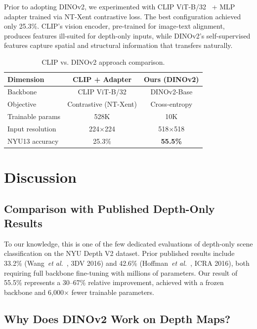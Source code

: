 \documentclass[conference, a4paper]{IEEEtran}
\begin{document}
Prior to adopting DINOv2, we experimented with CLIP ViT-B/32~\cite{clip} + MLP adapter
trained via NT-Xent contrastive loss. The best configuration achieved only 25.3\%.
CLIP's vision encoder, pre-trained for image-text alignment, produces features ill-suited
for depth-only inputs, while DINOv2's self-supervised features capture spatial and
structural information that transfers naturally.

\begin{table}[htb]
    \centering
    \caption{CLIP vs. DINOv2 approach comparison.}
    \label{tab:comparison}
    \footnotesize
    \begin{tabular}{lcc}
        \toprule
        \textbf{Dimension} & \textbf{CLIP + Adapter} & \textbf{Ours (DINOv2)} \\
        \midrule
        Backbone & CLIP ViT-B/32 & DINOv2-Base \\
        Objective & Contrastive (NT-Xent) & Cross-entropy \\
        Trainable params & 528K & 10K \\
        Input resolution & 224$\times$224 & 518$\times$518 \\
        NYU13 accuracy & 25.3\% & \textbf{55.5\%} \\
        \bottomrule
    \end{tabular}
\end{table}

\section{Discussion}

\subsection{Comparison with Published Depth-Only Results}

To our knowledge, this is one of the few dedicated evaluations of depth-only scene
classification on the NYU Depth V2 dataset. Prior published results include
33.2\% (Wang~\textit{et al.}~\cite{wang3d}, 3DV 2016) and 42.6\%
(Hoffman~\textit{et al.}~\cite{hoffman2016}, ICRA 2016), both requiring full
backbone fine-tuning with millions of parameters. Our result of 55.5\%
represents a 30--67\% relative improvement, achieved with a frozen backbone
and 6,000$\times$ fewer trainable parameters.

\subsection{Why Does DINOv2 Work on Depth Maps?}
\end{document}
